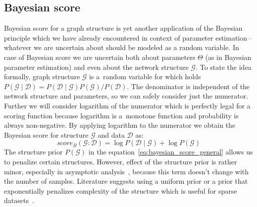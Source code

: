 \documentclass[english,cover]{fitthesis} %
\begin{document}
\subsection{Bayesian score}
Bayesian score for a graph structure is yet another application of the Bayesian principle which we have already encountered in context of parameter estimation\,--\,whatever we are uncertain about should be modeled as a random variable. In case of Bayesian score we are uncertain both about parameters $\Theta$ (as in Bayesian parameter estimation) and even about the network structure $\mathcal{G}$. To state the idea formally, graph structure $\mathcal{G}$ is a~random variable for which holds $P(\mathcal{G} \mid \mathcal{D}) = P(\mathcal{D} \mid \mathcal{G}) P(\mathcal{G}) / P(\mathcal{D})$. The denominator is independent of the network structure and parameters, so we can safely consider just the numerator. Further we will consider logarithm of the numerator which is perfectly legal for a scoring function because logarithm is a~monotone function and probability is always non-negative. By applying logarithm to the numerator we obtain the Bayesian score for structure $\mathcal{G}$ and data $\mathcal{D}$ as:
\begin{equation}\label{eq:bayesian_score_general}
    score_B(\mathcal{G} : \mathcal{D}) = \log P(\mathcal{D} \mid \mathcal{G}) + \log P(\mathcal{G})
\end{equation}
The structure prior $P(\mathcal{G})$ in the equation~\eqref{eq:bayesian_score_general} allows us to penalize certain structures. However, effect of the structure prior is rather minor, especially in asymptotic analysis~\cite[p.~804]{pgm}, because this term doesn't change with the number of samples. Literature suggests using a uniform prior or a prior that exponentially penalizes complexity of the structure which is useful for sparse datasets~\cite{pgm}.
\end{document}
